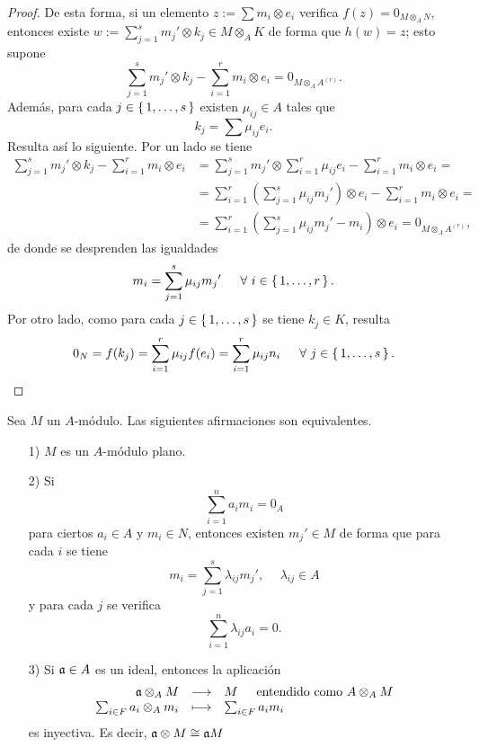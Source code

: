 \documentclass[../main.tex]{subfiles}
\begin{document}
\begin{proof}
	De esta forma, si un elemento $z:=\sum m_i\otimes e_i$ verifica $f(z)=0_{M\otimes_A N}$, entonces existe $w:=\sum_{j=1}^s{m_j}'\otimes k_j\in M\otimes_A K$ de forma que $h(w)=z$; esto supone
	$$\sum_{j=1}^s {m_j}'\otimes k_j-\sum_{i=1}^r m_i\otimes e_i=0_{M\otimes_A A^{(r)}}.$$
	Además, para cada $j\in\set{1,\dots,s}$ existen $\mu_{ij}\in A$ tales que $$k_j=\sum \mu_{ij}e_i.$$
	Resulta así lo siguiente. Por un lado se tiene
	\begin{align*}
	\sum_{j=1}^s {m_j}'\otimes k_j-\sum_{i=1}^r m_i\otimes e_i&=\sum_{j=1}^s {m_j}'\otimes \sum_{i=1}^r \mu_{ij}e_i-\sum_{i=1}^r m_i\otimes e_i=\\
	&=\sum_{i=1}^r(\sum_{j=1}^s\mu_{ij}{m_j}')\otimes e_i-\sum_{i=1}^r m_i\otimes e_i=\\
	&=\sum_{i=1}^r(\sum_{j=1}^s\mu_{ij}{m_j}'-m_i)\otimes e_i=0_{M\otimes_A A^{(r)}},
	\end{align*}
	de donde se desprenden las igualdades
	\begin{equation}
	m_i=\sum_{j=1}^s\mu_{ij}{m_j}'\hspace{15pt}\forall\ i\in\set{1,\dots,r}.
	\end{equation}
	Por otro lado, como para cada $j\in\set{1,\dots,s}$ se tiene $k_j\in K$, resulta
	\begin{equation}
	0_N=f(k_j)=\sum_{i=1}^r\mu_{ij}f(e_i)=\sum_{i=1}^r\mu_{ij}n_i\hspace{15pt}\forall\ j\in\set{1,\dots,s}.
	\end{equation}

\end{proof}
\begin{theorem}
	Sea $M$ un $A$-módulo. Las siguientes afirmaciones son equivalentes.
	\begin{itemize}
		\item[1)]  $M$ es un $A$-módulo plano.
		\item[2)] Si $$\sum_{i=1}^na_im_i=0_A$$ para ciertos $a_i\in A$ y $m_i\in N$, entonces existen ${m_j}'\in M$ de forma que para cada $i$ se tiene $$m_i=\sum_{j=1}^s\lambda_{ij}{m_j}',\hspace{15pt}\lambda_{ij}\in A$$ y para cada $j$ se verifica $$\sum_{i=1}^n\lambda_{ij}a_i=0.$$
		\item [3)]  Si $\mathfrak{a}\in A$ es un ideal, entonces la aplicación
		$$\begin{array}{rcl}
		\af\otimes_A M&\longrightarrow&M\hspace{15pt}\text{entendido como}\ A\otimes_A M\\
		\sum_{i\in F}a_i\otimes_A m_i&\longmapsto&\sum_{i\in F}a_im_i
		\end{array}$$
		es inyectiva. Es decir, $\mathfrak{a}\otimes M\cong \mathfrak{a} M$
	\end{itemize}
\end{theorem}
\end{document}
